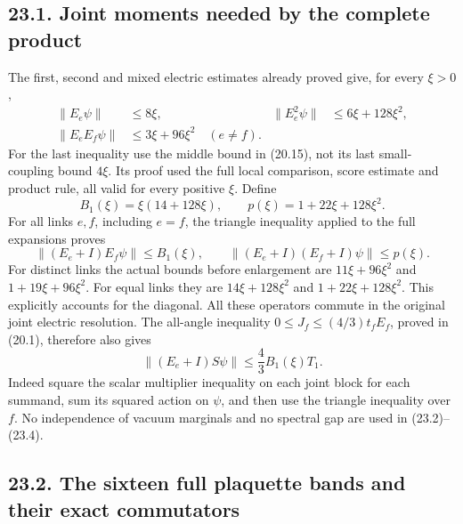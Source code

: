 \documentclass[
]{article}
\begin{document}
\subsection{23.1. Joint moments needed by the complete
product}\label{joint-moments-needed-by-the-complete-product}

The first, second and mixed electric estimates already proved give, for
every \(\xi>0\), \[
\begin{aligned}
\|E_e\psi\|&\le8\xi,&
\|E_e^2\psi\|&\le6\xi+128\xi^2,\\
\|E_eE_f\psi\|&\le3\xi+96\xi^2\quad(e\ne f).
\end{aligned}\tag{23.2}
\] For the last inequality use the middle bound in (20.15), not its last
small-coupling bound \(4\xi\). Its proof used the full local comparison,
score estimate and product rule, all valid for every positive \(\xi\).
Define \[
B_1(\xi)=\xi(14+128\xi),\qquad
p(\xi)=1+22\xi+128\xi^2.
\] For all links \(e,f\), including \(e=f\), the triangle inequality
applied to the full expansions proves \[
\|(E_e+I)E_f\psi\|\le B_1(\xi),\qquad
\|(E_e+I)(E_f+I)\psi\|\le p(\xi).
\tag{23.3}
\] For distinct links the actual bounds before enlargement are
\(11\xi+96\xi^2\) and \(1+19\xi+96\xi^2\). For equal links they are
\(14\xi+128\xi^2\) and \(1+22\xi+128\xi^2\). This explicitly accounts
for the diagonal. All these operators commute in the original joint
electric resolution. The all-angle inequality
\(0\le J_f\le(4/3)t_fE_f\), proved in (20.1), therefore also gives \[
\|(E_e+I)S\psi\|
 \le\frac43 B_1(\xi)T_1 .
\tag{23.4}
\] Indeed square the scalar multiplier inequality on each joint block
for each summand, sum its squared action on \(\psi\), and then use the
triangle inequality over \(f\). No independence of vacuum marginals and
no spectral gap are used in (23.2)--(23.4).

\subsection{23.2. The sixteen full plaquette bands and their exact
commutators}\label{the-sixteen-full-plaquette-bands-and-their-exact-commutators}
\end{document}
